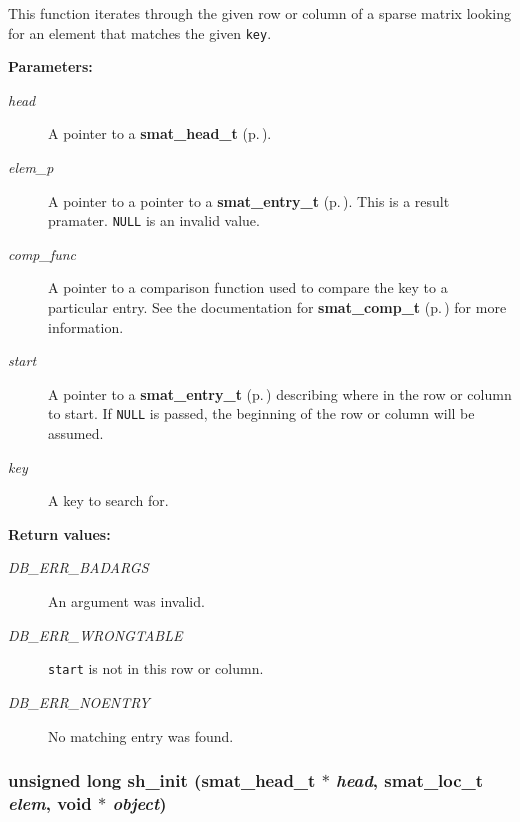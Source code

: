  This function iterates through the given row or column of a sparse matrix looking for an element that matches the given {\tt key}.\begin{Desc}
\item[{\bf Parameters: }]\par
\begin{description}
\item[
{\em head}]A pointer to a {\bf smat\_\-head\_\-t} {\rm (p.\,\pageref{group__dbprim__smat_a1})}. \item[
{\em elem\_\-p}]A pointer to a pointer to a {\bf smat\_\-entry\_\-t} {\rm (p.\,\pageref{group__dbprim__smat_a2})}. This is a result pramater. {\tt NULL} is an invalid value. \item[
{\em comp\_\-func}]A pointer to a comparison function used to compare the key to a particular entry. See the documentation for {\bf smat\_\-comp\_\-t} {\rm (p.\,\pageref{group__dbprim__smat_a5})} for more information. \item[
{\em start}]A pointer to a {\bf smat\_\-entry\_\-t} {\rm (p.\,\pageref{group__dbprim__smat_a2})} describing where in the row or column to start. If {\tt NULL} is passed, the beginning of the row or column will be assumed. \item[
{\em key}]A key to search for.\end{description}
\end{Desc}
\begin{Desc}
\item[{\bf Return values: }]\par
\begin{description}
\item[
{\em DB\_\-ERR\_\-BADARGS}]An argument was invalid. \item[
{\em DB\_\-ERR\_\-WRONGTABLE}]{\tt start} is not in this row or column. \item[
{\em DB\_\-ERR\_\-NOENTRY}]No matching entry was found. \end{description}
\end{Desc}
\subsubsection{\setlength{\rightskip}{0pt plus 5cm}unsigned long sh\_\-init ({\bf smat\_\-head\_\-t} $\ast$ {\em head}, {\bf smat\_\-loc\_\-t} {\em elem}, void $\ast$ {\em object})}\label{group__dbprim__smat_a17}




